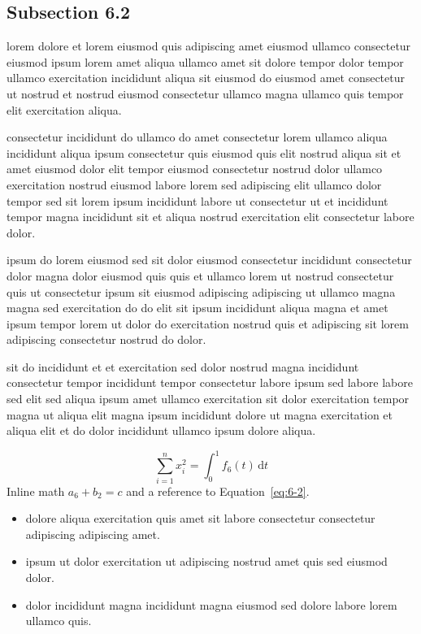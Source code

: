 \documentclass{article}
\begin{document}
\subsection{Subsection 6.2}\label{sec:6-2}
lorem dolore et lorem eiusmod quis adipiscing amet eiusmod ullamco consectetur eiusmod ipsum lorem amet aliqua ullamco amet sit dolore tempor dolor tempor ullamco exercitation incididunt aliqua sit eiusmod do eiusmod amet consectetur ut nostrud et nostrud eiusmod consectetur ullamco magna ullamco quis tempor elit exercitation aliqua.

consectetur incididunt do ullamco do amet consectetur lorem ullamco aliqua incididunt aliqua ipsum consectetur quis eiusmod quis elit nostrud aliqua sit et amet eiusmod dolor elit tempor eiusmod consectetur nostrud dolor ullamco exercitation nostrud eiusmod labore lorem sed adipiscing elit ullamco dolor tempor sed sit lorem ipsum incididunt labore ut consectetur ut et incididunt tempor magna incididunt sit et aliqua nostrud exercitation elit consectetur labore dolor.

ipsum do lorem eiusmod sed sit dolor eiusmod consectetur incididunt consectetur dolor magna dolor eiusmod quis quis et ullamco lorem ut nostrud consectetur quis ut consectetur ipsum sit eiusmod adipiscing adipiscing ut ullamco magna magna sed exercitation do do elit sit ipsum incididunt aliqua magna et amet ipsum tempor lorem ut dolor do exercitation nostrud quis et adipiscing sit lorem adipiscing consectetur nostrud do dolor.

sit do incididunt et et exercitation sed dolor nostrud magna incididunt consectetur tempor incididunt tempor consectetur labore ipsum sed labore labore sed elit sed aliqua ipsum amet ullamco exercitation sit dolor exercitation tempor magna ut aliqua elit magna ipsum incididunt dolore ut magna exercitation et aliqua elit et do dolor incididunt ullamco ipsum dolore aliqua.

\begin{equation}\label{eq:6-2}
  \sum_{i=1}^{n} x_i^{2} = \int_0^1 f_{6}(t)\,\mathrm{d}t
\end{equation}
Inline math $a_{6} + b_{2} = c$ and a reference to Equation~\eqref{eq:6-2}.

\begin{itemize}
  \item dolore aliqua exercitation quis amet sit labore consectetur consectetur adipiscing adipiscing amet.
  \item ipsum ut dolor exercitation ut adipiscing nostrud amet quis sed eiusmod dolor.
  \item dolor incididunt magna incididunt magna eiusmod sed dolore labore lorem ullamco quis.
\end{itemize}
\end{document}

